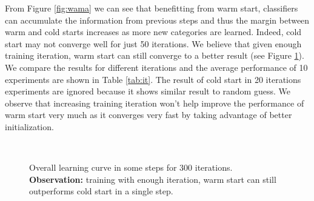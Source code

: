 From Figure \ref{fig:wama} we can see that benefitting from warm start, classifiers can accumulate the information from previous steps and thus the margin between warm and cold starts increases as more new categories are learned. Indeed, cold start may not converge well for just 50 iterations. We believe that given enough training iteration, warm start can still converge to a better result (see Figure \ref{fig:errdiff}). We compare the results for different iterations and the average performance of 10 experiments are shown in Table \ref{tab:it}. The result of cold start in 20 iterations experiments are ignored because it shows similar result to random guess. We observe that increasing training iteration won't help improve the performance of warm start very much as it converges very fast by taking advantage of better initialization.
\begin{figure}[htbp]
\centering
{}
\\
\caption{Overall learning curve in some steps for 300 iterations. \textbf{Observation:} training with enough iteration, warm start can still outperforms cold start in a single step.}
\label{fig:errdiff}
\end{figure}

